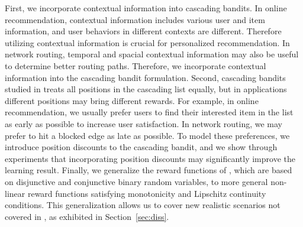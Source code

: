 \documentclass{article}
\begin{document}
First, we incorporate contextual information into cascading bandits.
In online recommendation, contextual information includes various user and item information, 
	and user behaviors in different contexts are different.
Therefore utilizing contextual information is crucial for personalized recommendation.
In network routing, temporal and spacial contextual information may also be useful to
	determine better routing paths.
Therefore, we incorporate contextual information into the cascading bandit formulation.
Second, cascading bandits studied in \cite{kveton2015cascading,kveton2015combinatorial}
	treats all positions in the cascading list equally, but in applications different positions
	may bring different rewards.
For example, in online recommendation, we usually prefer users to find their interested item
	in the list as early as possible to increase user satisfaction.
In network routing, we may prefer to hit a blocked edge as late as possible.
To model these preferences, we introduce position discounts to the cascading bandit, and
	we show through experiments that incorporating position discounts may significantly
	improve the learning result.
Finally, we generalize the reward functions of \cite{kveton2015cascading,kveton2015combinatorial},
	which are based on disjunctive and conjunctive binary random variables, to more general
	non-linear reward functions satisfying monotonicity and Lipschitz continuity conditions.
This generalization allows us to cover new realistic scenarios not covered in
	\cite{kveton2015cascading,kveton2015combinatorial}, as exhibited in Section~\ref{sec:diss}.


\end{document}
